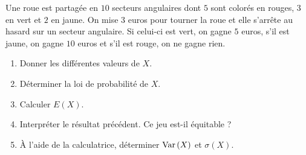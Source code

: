 \documentclass[11pt]{article}
\begin{document}
\begin{app}
  Une roue est partagée en $10$ secteurs angulaires dont $5$ sont colorés en
  rouges, $3$ en vert et $2$ en jaune. On mise $3$ euros pour tourner la roue et
  elle s'arrête au hasard sur un secteur angulaire. Si celui-ci est vert, on
  gagne $5$ euros, s'il est jaune, on gagne $10$ euros et s'il est rouge, on ne
  gagne rien.
  \begin{enumerate}
    \item Donner les différentes valeurs de $X$.
    \item Déterminer la loi de probabilité de $X$.
    \item Calculer $E\left( X \right)$.
    \item Interpréter le résultat précédent. Ce jeu est-il équitable ?
    \item À l'aide de la calculatrice, déterminer $\operatorname{Var}\left( X \right)$ et
      $\sigma\left( X \right)$.
  \end{enumerate}
\end{app}
\end{document}
